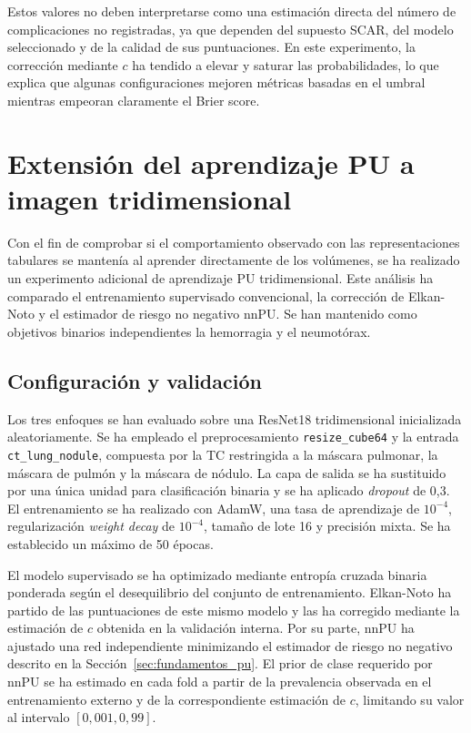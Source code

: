 Estos valores no deben interpretarse como una estimación directa del número de complicaciones no registradas, ya que dependen del supuesto SCAR, del modelo seleccionado y de la calidad de sus puntuaciones. En este experimento, la corrección mediante \(c\) ha tendido a elevar y saturar las probabilidades, lo que explica que algunas configuraciones mejoren métricas basadas en el umbral mientras empeoran claramente el Brier score.


\section{Extensión del aprendizaje PU a imagen tridimensional}\label{sec:pu_3d}

Con el fin de comprobar si el comportamiento observado con las representaciones tabulares se mantenía al aprender directamente de los volúmenes, se ha realizado un experimento adicional de aprendizaje PU tridimensional. Este análisis ha comparado el entrenamiento supervisado convencional, la corrección de Elkan-Noto y el estimador de riesgo no negativo nnPU. Se han mantenido como objetivos binarios independientes la hemorragia y el neumotórax.

\subsection{Configuración y validación}

Los tres enfoques se han evaluado sobre una ResNet18 tridimensional inicializada aleatoriamente. Se ha empleado el preprocesamiento \texttt{resize\_cube64} y la entrada \texttt{ct\_lung\_nodule}, compuesta por la TC restringida a la máscara pulmonar, la máscara de pulmón y la máscara de nódulo. La capa de salida se ha sustituido por una única unidad para clasificación binaria y se ha aplicado \textit{dropout} de 0,3. El entrenamiento se ha realizado con AdamW, una tasa de aprendizaje de \(10^{-4}\), regularización \textit{weight decay} de \(10^{-4}\), tamaño de lote 16 y precisión mixta. Se ha establecido un máximo de 50 épocas.

El modelo supervisado se ha optimizado mediante entropía cruzada binaria ponderada según el desequilibrio del conjunto de entrenamiento. Elkan-Noto ha partido de las puntuaciones de este mismo modelo y las ha corregido mediante la estimación de \(c\) obtenida en la validación interna. Por su parte, nnPU ha ajustado una red independiente minimizando el estimador de riesgo no negativo descrito en la Sección~\ref{sec:fundamentos_pu}. El prior de clase requerido por nnPU se ha estimado en cada fold a partir de la prevalencia observada en el entrenamiento externo y de la correspondiente estimación de \(c\), limitando su valor al intervalo \([0{,}001,0{,}99]\).

